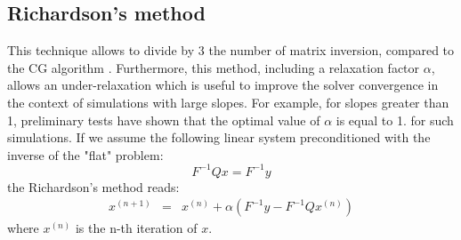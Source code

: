 \subsection{Richardson's method}
\par This technique allows to divide by 3 the number of matrix inversion,
compared to the CG algorithm . Furthermore, this method, including a
relaxation factor $\alpha$, allows an under-relaxation  which is useful to
improve the solver convergence in the context of simulations with large slopes.
For example, for slopes greater than 1, preliminary tests have shown that the
optimal value of $\alpha$ is equal to 1. for such simulations. If we assume the
following linear system preconditioned with the inverse of the "flat" problem:
\begin{equation}
F^{-1} Q x = F^{-1} y
\end{equation}
the Richardson's method reads:
\begin{eqnarray*}
x^{(n+1)} &=& x^{(n)} + \alpha (F^{-1} y - F^{-1} Q x^{(n)} )
\end{eqnarray*}
where $x^{(n)}$ is the n-th iteration of $x$.\\
